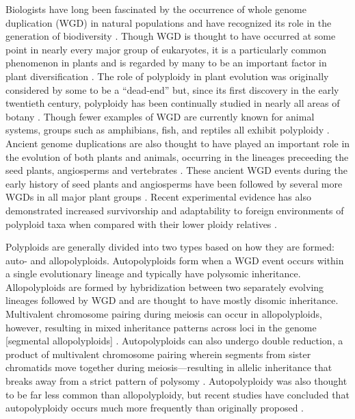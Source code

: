 \documentclass[11pt,english,letterpaper,oneside]{article}
\begin{document}
Biologists have long been fascinated by the occurrence of whole genome duplication (WGD) in natural populations and have recognized its role in the generation of biodiversity \citep{ClausKeckHies1940,StebbinsVariationEvolution,GrantPlantSpeciation,otto2000polyploidy}. Though WGD is thought to have occurred at some point in nearly every major group of eukaryotes, it is a particularly common phenomenon in plants and is regarded by many to be an important factor in plant diversification \citep{wood2009polyploid,soltisd2009diversification,scarpino2014polyploid}. The role of polyploidy in plant evolution was originally considered by some to be a ``dead-end'' \citep{StebbinsVariationEvolution,wagner1970noise,soltisd2014stebbins} but, since its first discovery in the early twentieth century, polyploidy has been continually studied in nearly all areas of botany \citep{winge1917polyploidy,Winkler1916polyploidy,ClausKeckHies1945polyploidy,GrantPlantSpeciation,StebbinsVariationEvolution,soltisD2003polyploid,soltisd2010polyploidUnknowns,soltai2009roleOfHybridization,ramsey2014polEcoProcRoySoc}. Though fewer examples of WGD are currently known for animal systems, groups such as amphibians, fish, and reptiles all exhibit polyploidy \citep{allendorf1984tetraploidFish,gregory2005polyploidyAnimals}. Ancient genome duplications are also thought to have played an important role in the evolution of both plants and animals, occurring in the lineages preceeding the seed plants, angiosperms and vertebrates \citep{ohno1970geneDuplication,otto2000polyploidy,furlong2001animalOctoploid,jiao2011ancientWGD}. These ancient WGD events during the early history of seed plants and angiosperms have been followed by several more WGDs in all major plant groups \citep{cui2006genomeDuplication,scarpino2014polyploid,canon2014polyploidyLegumes}. Recent experimental evidence has also demonstrated increased survivorship and adaptability to foreign environments of polyploid taxa when compared with their lower ploidy relatives \citep{ramsey2011polyploidEcology,Selmecki2015yeastAdaptation}.
\medskip

Polyploids are generally divided into two types based on how they are formed: auto- and allopolyploids. Autopolyploids form when a WGD event occurs within a single evolutionary lineage and typically have polysomic inheritance. Allopolyploids are formed by hybridization between two separately evolving lineages followed by WGD and are thought to have mostly disomic inheritance. Multivalent chromosome pairing during meiosis can occur in allopolyploids, however, resulting in mixed inheritance patterns across loci in the genome [segmental allopolyploids] \citep{StebbinsVariationEvolution}. Autopolyploids can also undergo double reduction, a product of multivalent chromosome pairing wherein segments from sister chromatids move together during meiosis---resulting in allelic inheritance that breaks away from a strict pattern of polysomy \citep{haldane1930autopolyploids}. Autopolyploidy was also thought to be far less common than allopolyploidy, but recent studies have concluded that autopolyploidy occurs much more frequently than originally proposed \citep{soltis2007autopolyploidy,parisod2010autopolyploidy}.
\medskip
\end{document}
